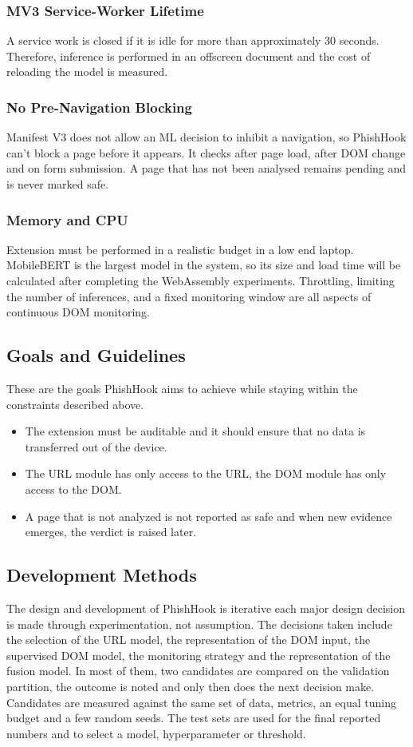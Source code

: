 \documentclass{FastFyp}
\begin{document}
\subsubsection{MV3 Service-Worker Lifetime}
A service work is closed if it is idle for more than approximately 30 seconds. Therefore, inference is performed in an offscreen document and the cost of reloading the model is measured.

\subsubsection{No Pre-Navigation Blocking}
Manifest V3 does not allow an ML decision to inhibit a navigation, so PhishHook can't block a page before it appears. It checks after page load, after DOM change and on form submission. A page that has not been analysed remains pending and is never marked safe.

\subsubsection{Memory and CPU}
Extension must be performed in a realistic budget in a low end laptop. MobileBERT is the largest model in the system, so its size and load time will be calculated after completing the WebAssembly experiments. Throttling, limiting the number of inferences, and a fixed monitoring window are all aspects of continuous DOM monitoring.


\subsection{Goals and Guidelines}
These are the goals PhishHook aims to achieve while staying within the constraints described above.

\begin{itemize}
    \item The extension must be auditable and it should ensure that no data is transferred out of the device.
    \item The URL module has only access to the URL, the DOM module has only access to the DOM.
    \item A page that is not analyzed is not reported as safe and when new evidence emerges, the verdict is raised later.
\end{itemize}

\subsection{Development Methods}
The design and development of PhishHook is iterative each major design decision is made through experimentation, not assumption. The decisions taken include the selection of the URL model, the representation of the DOM input, the supervised DOM model, the monitoring strategy and the representation of the fusion model. In most of them, two candidates are compared on the validation partition, the outcome is noted and only then does the next decision make. Candidates are measured against the same set of data, metrics, an equal tuning budget and a few random seeds. The test sets are used for the final reported numbers and to select a model, hyperparameter or threshold.
\end{document}
